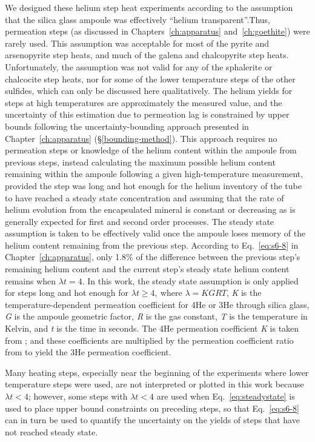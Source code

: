 We designed these helium step heat experiments according to the 
assumption that the silica glass ampoule was effectively ``helium transparent''.Thus, permeation steps 
(as discussed in Chapters~\ref{ch:apparatus} and~\ref{ch:goethite}) were
rarely used. This assumption was acceptable for most of the pyrite and arsenopyrite step heats, and much of the galena
and chalcopyrite step heats. Unfortunately, the assumption was not valid for any of the sphalerite or chalcocite step heats, 
nor for some of the lower temperature steps of the other sulfides, which can only be discussed here qualitatively.
The helium yields for steps at high temperatures are approximately the measured value, and the uncertainty of this estimation due to 
permeation lag is constrained by upper bounds following the uncertainty-bounding 
approach presented in Chapter~\ref{ch:apparatus} (\S\ref{bounding-method}). This approach
requires no permeation steps or knowledge of the helium content within the ampoule from previous
steps, instead calculating the maximum possible helium content remaining within
the ampoule following a given high-temperature measurement, provided the step was long and hot
enough for the helium inventory of the tube to have reached a steady state concentration and
assuming that the rate of helium evolution from the encapsulated mineral
is constant or decreasing as is generally expected for first and second order processes. The steady state assumption is taken to be effectively
valid once the ampoule loses memory of the helium content remaining from
the previous step. According to Eq.~\eqref{eq:s6-8} in Chapter~\ref{ch:apparatus}, only 1.8\% of the
difference between the previous step's remaining helium content and the
current step's steady state helium content remains when
\(\lambda t = 4\). In this work, the steady state assumption is only
applied for steps long and hot enough for \(\lambda t \geq 4,\ \)where
\(\lambda = KGRT\), \emph{K} is the temperature-dependent permeation
coefficient for 4He or 3He through silica glass, \emph{G} is the ampoule
geometric factor, \emph{R} is the gas constant, \emph{T} is the
temperature in Kelvin, and \emph{t} is the time in seconds. The 4He
permeation coefficient \emph{K} is taken from \citet{swets1961}; and
these coefficients are multiplied by the permeation coefficient ratio
from \citet{jones1953} to yield the 3He permeation coefficient.

Many heating steps, especially near the beginning of the experiments
where lower temperature steps were used, are not interpreted or plotted
in this work because \(\lambda t < 4\); however, some steps with
\(\lambda t < 4\) are used when Eq.~\eqref{eq:steadystate} is used to place upper bound
constraints on preceding steps, so that Eq.~\eqref{eq:s6-8} can in turn be used to
quantify the uncertainty on the yields of steps that have not reached steady
state. 

